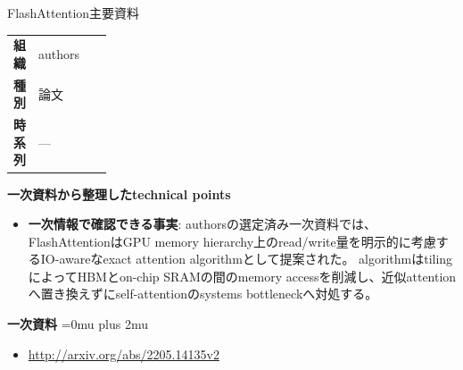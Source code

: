 \begin{technicalnote}{FlashAttention}{主要資料}
\begingroup
\begin{tabularx}{\linewidth}{@{}>{\bfseries}p{0.22\linewidth}X@{}}
組織 & authors \\
種別 & 論文 \\
時系列 & — \\
\end{tabularx}
\smallskip
{\bfseries 一次資料から整理したtechnical points}
\begin{itemize}[leftmargin=1.5em,itemsep=0.35em]
\item \textbf{一次情報で確認できる事実}: authorsの選定済み一次資料では、FlashAttentionはGPU memory hierarchy上のread/write量を明示的に考慮するIO-awareなexact attention algorithmとして提案された。 algorithmはtilingによってHBMとon-chip SRAMの間のmemory accessを削減し、近似attentionへ置き換えずにself-attentionのsystems bottleneckへ対処する。
\end{itemize}
\begin{minipage}{\linewidth}
\begin{samepage}
{\bfseries 一次資料}
\begingroup\sloppy
\Urlmuskip=0mu plus 2mu\relax
\begin{itemize}[leftmargin=1.5em,itemsep=0.25em]
\item {\scriptsize\url{http://arxiv.org/abs/2205.14135v2}}
\end{itemize}
\endgroup
\end{samepage}
\end{minipage}
\endgroup
\end{technicalnote}
\medskip

